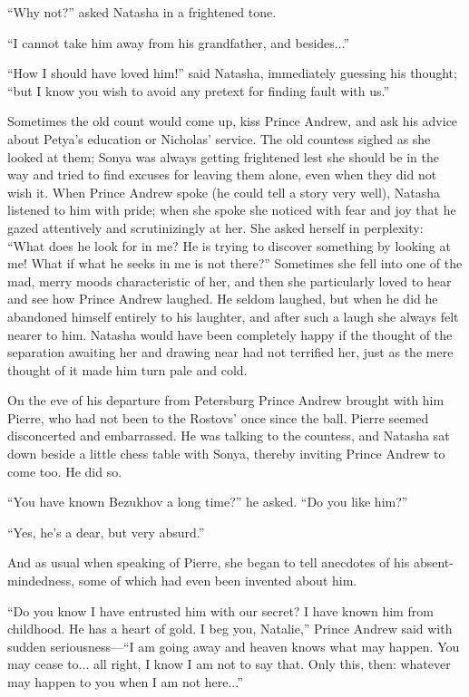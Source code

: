 ``Why not?'' asked Natasha in a frightened tone.

``I cannot take him away from his grandfather, and besides...''

``How I should have loved him!'' said Natasha, immediately
guessing his thought; ``but I know you wish to avoid any pretext
for finding fault with us.''

Sometimes the old count would come up, kiss Prince Andrew, and
ask his advice about Petya's education or Nicholas' service. The
old countess sighed as she looked at them; Sonya was always
getting frightened lest she should be in the way and tried to
find excuses for leaving them alone, even when they did not wish
it. When Prince Andrew spoke (he could tell a story very well),
Natasha listened to him with pride; when she spoke she noticed
with fear and joy that he gazed attentively and scrutinizingly at
her. She asked herself in perplexity: ``What does he look for in
me? He is trying to discover something by looking at me!  What if
what he seeks in me is not there?'' Sometimes she fell into one
of the mad, merry moods characteristic of her, and then she
particularly loved to hear and see how Prince Andrew laughed. He
seldom laughed, but when he did he abandoned himself entirely to
his laughter, and after such a laugh she always felt nearer to
him. Natasha would have been completely happy if the thought of
the separation awaiting her and drawing near had not terrified
her, just as the mere thought of it made him turn pale and cold.

On the eve of his departure from Petersburg Prince Andrew brought
with him Pierre, who had not been to the Rostovs' once since the
ball. Pierre seemed disconcerted and embarrassed. He was talking
to the countess, and Natasha sat down beside a little chess table
with Sonya, thereby inviting Prince Andrew to come too. He did
so.

``You have known Bezukhov a long time?'' he asked. ``Do you like
him?''

``Yes, he's a dear, but very absurd.''

And as usual when speaking of Pierre, she began to tell anecdotes
of his absent-mindedness, some of which had even been invented
about him.

``Do you know I have entrusted him with our secret? I have known
him from childhood. He has a heart of gold. I beg you, Natalie,''
Prince Andrew said with sudden seriousness---``I am going away
and heaven knows what may happen. You may cease to... all right,
I know I am not to say that. Only this, then: whatever may happen
to you when I am not here...''

